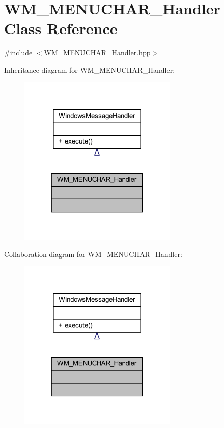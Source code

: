 \hypertarget{class_w_m___m_e_n_u_c_h_a_r___handler}{}\section{W\+M\+\_\+\+M\+E\+N\+U\+C\+H\+A\+R\+\_\+\+Handler Class Reference}
\label{class_w_m___m_e_n_u_c_h_a_r___handler}


{\ttfamily \#include $<$W\+M\+\_\+\+M\+E\+N\+U\+C\+H\+A\+R\+\_\+\+Handler.\+hpp$>$}



Inheritance diagram for W\+M\+\_\+\+M\+E\+N\+U\+C\+H\+A\+R\+\_\+\+Handler\+:\nopagebreak
\begin{figure}[H]
\begin{center}
\leavevmode
\includegraphics[width=214pt]{class_w_m___m_e_n_u_c_h_a_r___handler__inherit__graph}
\end{center}
\end{figure}


Collaboration diagram for W\+M\+\_\+\+M\+E\+N\+U\+C\+H\+A\+R\+\_\+\+Handler\+:\nopagebreak
\begin{figure}[H]
\begin{center}
\leavevmode
\includegraphics[width=214pt]{class_w_m___m_e_n_u_c_h_a_r___handler__coll__graph}
\end{center}
\end{figure}
